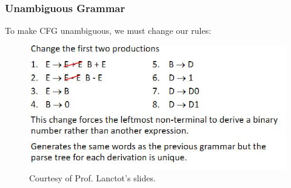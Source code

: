 \documentclass{report}
\begin{document}
\subsubsection{Unambiguous Grammar}
To make CFG unambiguous, we must change our rules:
\begin{figure}[ht]
\begin{center}
\includegraphics[scale=0.7]{cfg3.jpg}
\end{center}
\caption{Courtesy of Prof. Lanctot's slides.}
\end{figure}
\end{document}
